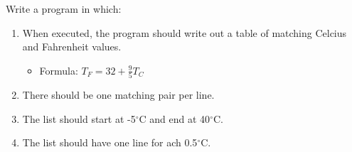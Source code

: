 \label{q:loops.cencius2fahrenheit}

Write a program in which:
\begin{enumerate}
  \item When executed, the program should write out a table of matching Celcius and Fahrenheit values.
    \begin{itemize}
      \item Formula: $T_F = 32 + \frac{9}{5} T_C$
    \end{itemize}
  \item There should be one matching pair per line.
  \item The list should start at -5$^\circ$C and end at 40$^\circ$C.
  \item The list should have one line for ach 0.5$^\circ$C.
\end{enumerate}
